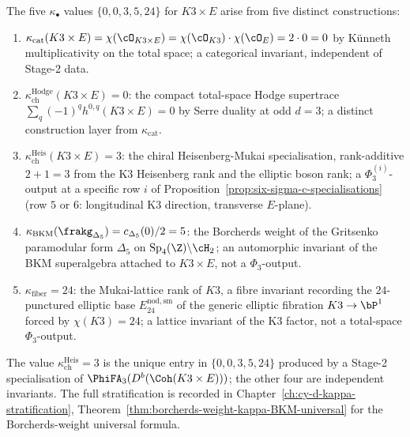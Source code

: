 \begin{remark}
\label{rem:four-kappas-not-phi3-applications}
The five $\kappa_\bullet$ values $\{0, 0, 3, 5, 24\}$ for $K3 \times E$ arise from five distinct constructions:
\begin{enumerate}[label=(\roman*)]
 \item $\kappa_{\mathrm{cat}}(K3 \times E) = \chi(\cO_{K3 \times E}) = \chi(\cO_{K3}) \cdot \chi(\cO_E) = 2 \cdot 0 = 0$ by K\"unneth multiplicativity on the total space; a categorical invariant, independent of Stage-2 data.
 \item $\kappa_{\mathrm{ch}}^{\mathrm{Hodge}}(K3 \times E) = 0$: the compact total-space Hodge supertrace $\sum_q (-1)^q h^{0,q}(K3 \times E) = 0$ by Serre duality at odd $d = 3$; a distinct construction layer from $\kappa_{\mathrm{cat}}$.
 \item $\kappa_{\mathrm{ch}}^{\mathrm{Heis}}(K3 \times E) = 3$: the chiral Heisenberg-Mukai specialisation, rank-additive $2 + 1 = 3$ from the K3 Heisenberg rank and the elliptic boson rank; a $\Phi_3^{(i)}$-output at a specific row $i$ of Proposition~\ref{prop:six-sigma-c-specialisations} (row $5$ or $6$: longitudinal K3 direction, transverse $E$-plane).
 \item $\kappa_{\mathrm{BKM}}(\frakg_{\Delta_5}) = c_{\Delta_5}(0)/2 = 5$: the Borcherds weight of the Gritsenko paramodular form $\Delta_5$ on $\mathrm{Sp}_4(\Z)\backslash\cH_2$; an automorphic invariant of the BKM superalgebra attached to $K3 \times E$, not a $\Phi_3$-output.
 \item $\kappa_{\mathrm{fiber}} = 24$: the Mukai-lattice rank of $K3$, a fibre invariant recording the $24$-punctured elliptic base $E_{24}^{\mathrm{nod,sm}}$ of the generic elliptic fibration $K3 \to \bP^1$ forced by $\chi(K3) = 24$; a lattice invariant of the K3 factor, not a total-space $\Phi_3$-output.
\end{enumerate}
The value $\kappa_{\mathrm{ch}}^{\mathrm{Heis}} = 3$ is the unique entry in $\{0, 0, 3, 5, 24\}$ produced by a Stage-2 specialisation of $\PhiFA_3(D^b(\Coh(K3 \times E)))$; the other four are independent invariants. The full stratification is recorded in Chapter~\ref{ch:cy-d-kappa-stratification}, Theorem~\ref{thm:borcherds-weight-kappa-BKM-universal} for the Borcherds-weight universal formula.
\end{remark}

